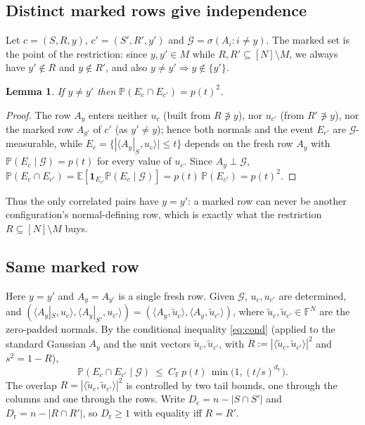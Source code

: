 \documentclass[11pt,reqno]{amsart}
\theoremstyle{plain}
\newtheorem{lemma}[theorem]{Lemma}
\theoremstyle{definition}
\theoremstyle{remark}
\newcommand{\F}{\mathbb{F}}
\newcommand{\PP}{\mathbb{P}}
\newcommand{\EE}{\mathbb{E}}
\newcommand{\one}{\mathbf{1}}
\newcommand{\dF}{d_{\F}}
\begin{document}
\subsection{Distinct marked rows give independence}
Let $c=(S,R,y)$, $c'=(S',R',y')$ and $\mathcal G=\sigma(A_i:i\neq y)$. The marked set is the point
of the restriction: since $y,y'\in M$ while $R,R'\subseteq[N]\setminus M$, we always have $y'\notin
R$ and $y\notin R'$, and also $y\neq y'\Rightarrow y\notin\{y'\}$.
\begin{lemma}\label{lem:indep}
If $y\neq y'$ then $\PP(E_c\cap E_{c'})=p(t)^2$.
\end{lemma}
\begin{proof}
The row $A_y$ enters neither $u_c$ (built from $R\not\ni y$), nor $u_{c'}$ (from $R'\not\ni y$), nor
the marked row $A_{y'}$ of $c'$ (as $y'\neq y$); hence both normals and the event $E_{c'}$ are
$\mathcal G$-measurable, while $E_c=\{|\langle A_y|_S,u_c\rangle|\le t\}$ depends on the fresh row
$A_y$ with $\PP(E_c\mid\mathcal G)=p(t)$ for every value of $u_c$. Since $A_y\perp\mathcal G$,
$\PP(E_c\cap E_{c'})=\EE[\one_{E_{c'}}\PP(E_c\mid\mathcal G)]=p(t)\,\PP(E_{c'})=p(t)^2$.
\end{proof}
Thus the only correlated pairs have $y=y'$: a marked row can never be another configuration's
normal-defining row, which is exactly what the restriction $R\subseteq[N]\setminus M$ buys.

\subsection{Same marked row}\label{sub:same}
Here $y=y'$ and $A_y=A_{y'}$ is a single fresh row. Given $\mathcal G$, $u_c,u_{c'}$ are determined,
and $(\langle A_y|_S,u_c\rangle,\langle A_y|_{S'},u_{c'}\rangle)=(\langle A_y,\tilde
u_c\rangle,\langle A_y,\tilde u_{c'}\rangle)$, where $\tilde u_c,\tilde u_{c'}\in\F^N$ are the
zero-padded normals. By the conditional inequality \eqref{eq:cond} (applied to the standard Gaussian
$A_y$ and the unit vectors $\tilde u_c,\tilde u_{c'}$, with $R:=|\langle\tilde u_c,\tilde
u_{c'}\rangle|^2$ and $s^2=1-R$),
\begin{equation}\label{eq:sameG}
  \PP(E_c\cap E_{c'}\mid\mathcal G)\ \le\ C_\F\,p(t)\,\min\!\bigl(1,(t/s)^{\dF}\bigr).
\end{equation}
The overlap $R=|\langle\tilde u_c,\tilde u_{c'}\rangle|^2$ is controlled by two tail bounds, one
through the columns and one through the rows. Write $D_{\mathrm c}=n-|S\cap S'|$ and $D_{\mathrm
r}=n-|R\cap R'|$, so $D_{\mathrm r}\ge1$ with equality iff $R=R'$.
\end{document}
